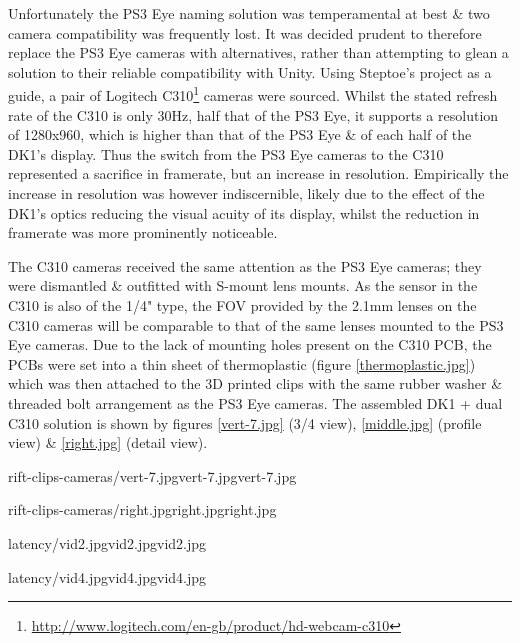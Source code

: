 Unfortunately the PS3 Eye naming solution was temperamental at best \& two camera compatibility was frequently lost. It was decided prudent to therefore replace the PS3 Eye cameras with alternatives, rather than attempting to glean a solution to their reliable compatibility with Unity. Using Steptoe's project as a guide, a pair of Logitech C310\footnote{\url{http://www.logitech.com/en-gb/product/hd-webcam-c310}} cameras were sourced. Whilst the stated refresh rate of the C310 is only 30Hz, half that of the PS3 Eye, it supports a resolution of 1280x960, which is higher than that of the PS3 Eye \& of each half of the DK1's display. Thus the switch from the PS3 Eye cameras to the C310 represented a sacrifice in framerate, but an increase in resolution. Empirically the increase in resolution was however indiscernible, likely due to the effect of the DK1's optics reducing the visual acuity of its display, whilst the reduction in framerate was more prominently noticeable.

The C310 cameras received the same attention as the PS3 Eye cameras; they were dismantled \& outfitted with S-mount lens mounts. As the sensor in the C310 is also of the 1/4" type, the FOV provided by the 2.1mm lenses on the C310 cameras will be comparable to that of the same lenses mounted to the PS3 Eye cameras. Due to the lack of mounting holes present on the C310 PCB, the PCBs were set into a thin sheet of thermoplastic (figure \ref{thermoplastic.jpg}) which was then attached to the 3D printed clips with the same rubber washer \& threaded bolt arrangement as the PS3 Eye cameras. The assembled DK1 + dual C310 solution is shown by figures \ref{vert-7.jpg} (3/4 view), \ref{middle.jpg} (profile view) \& \ref{right.jpg} (detail view).

       {rift-clips-cameras/vert-7.jpg}{vert-7.jpg}{vert-7.jpg}

       {rift-clips-cameras/right.jpg}{right.jpg}{right.jpg}



       {latency/vid2.jpg}{vid2.jpg}{vid2.jpg}

       {latency/vid4.jpg}{vid4.jpg}{vid4.jpg}



